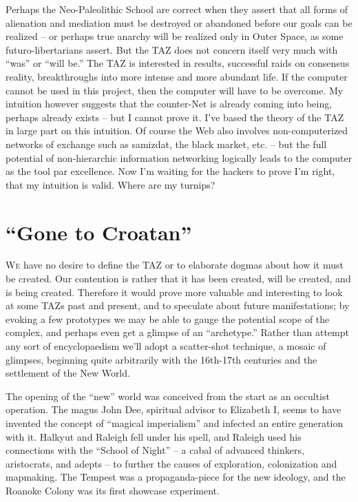 \documentclass[a4paper,english,10pt,twoside]{article}
\begin{document}
\medskip
Perhaps the Neo-Paleolithic School are correct when they assert that all forms of alienation and mediation must be destroyed or abandoned before our goals can be realized -- or perhaps true anarchy will be realized only in Outer Space, as some futuro-libertarians assert. But the TAZ does not concern itself very much with \enquote{was} or \enquote{will be.} The TAZ is interested in results, successful raids on consensus reality, breakthroughs into more intense and more abundant life. If the computer cannot be used in this project, then the computer will have to be overcome. My intuition however suggests that the counter-Net is already coming into being, perhaps already exists -- but I cannot prove it. I've based the theory of the TAZ in large part on this intuition. Of course the Web also involves non-computerized networks of exchange such as samizdat, the black market, etc. -- but the full potential of non-hierarchic information networking logically leads to the computer as the tool par excellence. Now I'm waiting for the hackers to prove I'm right, that my intuition is valid. Where are my turnips?

\section{\enquote{Gone to Croatan}}

\lettrine{W}{e} have no desire to define the TAZ or to elaborate dogmas about how it must be created. Our contention is rather that it has been created, will be created, and is being created. Therefore it would prove more valuable and interesting to look at some TAZs past and present, and to speculate about future manifestations; by evoking a few prototypes we may be able to gauge the potential scope of the complex, and perhaps even get a glimpse of an \enquote{archetype.} Rather than attempt any sort of encyclopaedism we'll adopt a scatter-shot technique, a mosaic of glimpses, beginning quite arbitrarily with the 16th-17th centuries and the settlement of the New World.

\medskip
The opening of the \enquote{new} world was conceived from the start as an occultist operation. The magus John Dee, spiritual advisor to Elizabeth I, seems to have invented the concept of \enquote{magical imperialism} and infected an entire generation with it. Halkyut and Raleigh fell under his spell, and Raleigh used his connections with the \enquote{School of Night} -- a cabal of advanced thinkers, aristocrats, and adepts -- to further the causes of exploration, colonization and mapmaking. The Tempest was a propaganda-piece for the new ideology, and the Roanoke Colony was its first showcase experiment.
\end{document}
